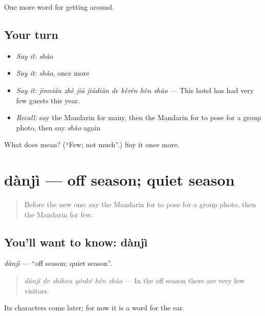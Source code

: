 \begin{grammarlens}[title={What you've built}]
One more word for getting around.
\end{grammarlens}

\subsection*{Your turn}
\begin{itemize}
\raggedright
  \item \emph{Say it:} \emph{shǎo}
  \item \emph{Say it:} \emph{shǎo}, once more
  \item \emph{Say it:} \emph{jīnnián zhè jiā jiǔdiàn de kèrén hěn shǎo} — This hotel has had very few guests this year.
  \item \emph{Recall:} say the Mandarin for many, then the Mandarin for to pose for a group photo, then say \emph{shǎo} again
\end{itemize}

\begin{tcolorbox}[breakable,colback=teal!4,colframe=teal!35!black,title={Before you move on}]
What does  mean? (\textquotedblleft{}Few; not much\textquotedblright{}.) Say it once more.
\end{tcolorbox}
\section[dànjì]{dànjì — off season; quiet season}

\label{lesson:ZH-C432-danji}



\begin{quote}
Before the new one: say the Mandarin for to pose for a group photo, then the Mandarin for few.
\end{quote}

\subsection*{You'll want to know: dànjì}
\emph{dànjì} — \textquotedblleft{}off season; quiet season\textquotedblright{}.

\begin{quote}
\emph{dànjì de shíhou yóukè hěn shǎo} — In the off season there are very few visitors.
\end{quote}

Its characters come later; for now it is a word for the ear.


